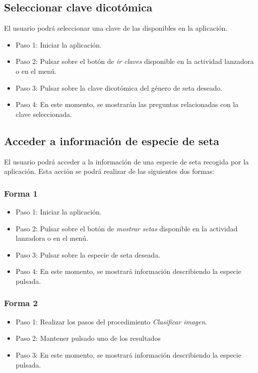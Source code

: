\subsection{Seleccionar clave dicotómica}

El usuario podrá seleccionar una clave de las disponibles en la aplicación.

\begin{itemize}
	\item Paso 1: Iniciar la aplicación.
	\item Paso 2: Pulsar sobre el botón de \textit{ir claves} disponible en la actividad lanzadora o en el menú.
	\item Paso 3: Pulsar sobre la clave dicotómica del género de seta deseado.
	\item Paso 4: En este momento, se mostrarán las preguntas relacionadas con la clave seleccionada.
\end{itemize}
\subsection{Acceder a información de especie de seta}

El usuario podrá acceder a la información de una especie de seta recogida por la aplicación. Esta acción se podrá realizar de las siguientes dos formas:

\subsubsection{Forma 1}

\begin{itemize}
	\item Paso 1: Iniciar la aplicación.
	\item Paso 2: Pulsar sobre el botón de \textit{mostrar setas} disponible en la actividad lanzadora o en el menú.
	\item Paso 3: Pulsar sobre la especie de seta deseada.
	\item Paso 4: En este momento, se mostrará información describiendo la especie pulsada.
\end{itemize}

\subsubsection{Forma 2}

\begin{itemize}
	\item Paso 1: Realizar los pasos del procedimiento \textit{Clasificar imagen}.
	\item Paso 2: Mantener pulsado uno de los resultados
	\item Paso 3: En este momento, se mostrará información describiendo la especie pulsada.
\end{itemize}

